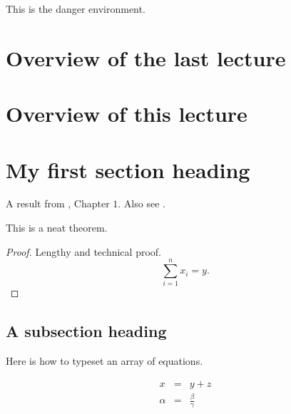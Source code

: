 \documentclass[12pt]{report}
\begin{document}

\maketitle



\begin{danger}
This is the danger environment.
\end{danger}

\section{Overview of the last lecture}

\section{Overview of this lecture}

\section{My first section heading}


A result from \cite{Hartline2013}, Chapter $1$. Also see \cite{Nisan2007}.

\begin{theorem}

\label{ThmNeat}
This is a neat theorem.
\end{theorem}

\begin{proof}
Lengthy and technical proof.
\begin{equation}
\sum_{i=1}^n x_i = y.
\end{equation}
\end{proof}


\subsection{A subsection heading}


Here is how to typeset an array of equations.

\begin{eqnarray}
	x & = & y + z \\
%
     \alpha & = & \frac{\beta}{\gamma}
\end{eqnarray}
\end{document}
